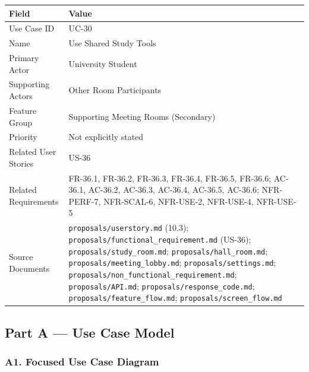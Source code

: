 \documentclass[12pt]{article}
\renewcommand{\baselinestretch}{1.5}
\begin{document}
\begingroup
\small
\renewcommand{\baselinestretch}{1.0}\selectfont
\renewcommand{\arraystretch}{1.15}
\setlength{\tabcolsep}{6pt}
\begin{longtable}{|>{\raggedright\arraybackslash}p{}|>{\raggedright\arraybackslash}p{}|}
\hline
\textbf{Field} & \textbf{Value} \\ \hline
\endhead
Use Case ID & UC-30 \\ \hline
Name & Use Shared Study Tools \\ \hline
Primary Actor & University Student \\ \hline
Supporting Actors & Other Room Participants \\ \hline
Feature Group & Supporting Meeting Rooms (Secondary) \\ \hline
Priority & Not explicitly stated \\ \hline
Related User Stories & US-36 \\ \hline
Related Requirements & FR-36.1, FR-36.2, FR-36.3, FR-36.4, FR-36.5, FR-36.6; AC-36.1, AC-36.2, AC-36.3, AC-36.4, AC-36.5, AC-36.6; NFR-PERF-7, NFR-SCAL-6, NFR-USE-2, NFR-USE-4, NFR-USE-5 \\ \hline
Source Documents & \texttt{proposals/userstory.md} (10.3); \texttt{proposals/functional\_requirement.md} (US-36); \texttt{proposals/study\_room.md}; \texttt{proposals/hall\_room.md}; \texttt{proposals/meeting\_lobby.md}; \texttt{proposals/settings.md}; \texttt{proposals/non\_functional\_requirement.md}; \texttt{proposals/API.md}; \texttt{proposals/response\_code.md}; \texttt{proposals/feature\_flow.md}; \texttt{proposals/screen\_flow.md} \\ \hline
\end{longtable}
\endgroup
\par\medskip

\hypertarget{sec:part-a-use-case-model}{}
\subsection*{Part A --- Use Case Model}
\par\medskip

\hypertarget{sec:a1-focused-use-case-diagram}{}
\subsubsection*{A1. Focused Use Case Diagram}
\par\medskip
\end{document}
